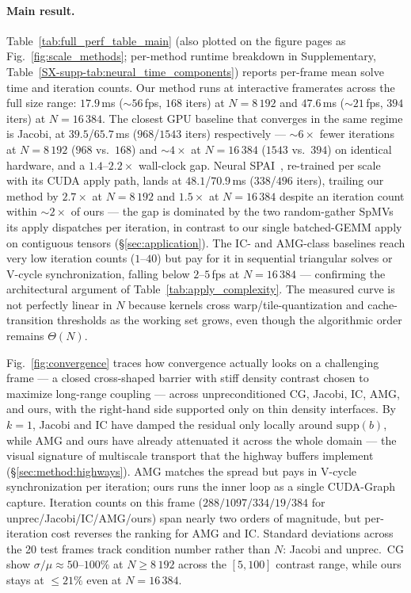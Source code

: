 \documentclass[acmtog,anonymous,review]{acmart}
\theoremstyle{plain}
\begin{document}
\paragraph{Main result.}
Table~\ref{tab:full_perf_table_main} (also plotted on the figure pages as
Fig.~\ref{fig:scale_methods}; per-method runtime breakdown in Supplementary,
Table~\ref{SX-supp-tab:neural_time_components}) reports per-frame mean solve time and
iteration counts. Our method runs at interactive framerates across the full size range:
$17.9$\,ms ($\sim\!56$\,fps, $168$ iters) at $N\!=\!8\,192$ and $47.6$\,ms
($\sim\!21$\,fps, $394$ iters) at $N\!=\!16\,384$. The closest GPU baseline that
converges in the same regime is Jacobi, at $39.5$/$65.7$\,ms ($968$/$1543$ iters)
respectively --- $\sim\!6\times$ fewer iterations at $N\!=\!8\,192$ ($968$ vs.\ $168$) and
$\sim\!4\times$ at $N\!=\!16\,384$ ($1543$ vs.\ $394$) on identical hardware, and a
$1.4$--$2.2\!\times$ wall-clock gap. Neural
SPAI~\cite{Yang2025sparse}, re-trained per scale with its CUDA apply path, lands at
$48.1$/$70.9$\,ms ($338$/$496$ iters), trailing our method by $2.7\times$ at
$N\!=\!8\,192$ and $1.5\times$ at $N\!=\!16\,384$ despite an iteration count within
$\sim\!2\times$ of ours --- the gap is dominated by the two random-gather SpMVs its
apply dispatches per iteration, in contrast to our single batched-GEMM apply on
contiguous tensors (\S\ref{sec:application}). The IC- and AMG-class baselines reach
very low iteration counts ($1$--$40$) but pay for it in sequential triangular solves
or V-cycle synchronization, falling below $2$--$5$\,fps at $N\!=\!16\,384$ ---
confirming the architectural argument of Table~\ref{tab:apply_complexity}. The measured
curve is not perfectly linear in $N$ because kernels cross warp/tile-quantization and
cache-transition thresholds as the working set grows, even though the algorithmic order
remains $\Theta(N)$.

Fig.~\ref{fig:convergence} traces how convergence actually looks on a challenging frame
--- a closed cross-shaped barrier with stiff density contrast chosen to maximize
long-range coupling --- across unpreconditioned CG, Jacobi, IC, AMG, and ours, with the
right-hand side supported only on thin density interfaces. By $k\!=\!1$, Jacobi and IC
have damped the residual only locally around $\mathrm{supp}(b)$, while AMG and ours have
already attenuated it across the whole domain --- the visual signature of multiscale
transport that the highway buffers implement (\S\ref{sec:method:highways}). AMG matches
the spread but pays in V-cycle synchronization per iteration; ours runs the inner loop
as a single CUDA-Graph capture. Iteration counts on this frame
($288/1097/334/19/384$ for unprec/Jacobi/IC/AMG/ours) span nearly two orders of
magnitude, but per-iteration cost reverses the ranking for AMG and IC. Standard
deviations across the 20 test frames track condition number rather than $N$: Jacobi and
unprec.\ CG show $\sigma/\mu\!\approx\!50$--$100\%$ at $N\!\ge\!8\,192$ across the
$[5,100]$ contrast range, while ours stays at $\le\!21\%$ even at $N\!=\!16\,384$.
\end{document}
